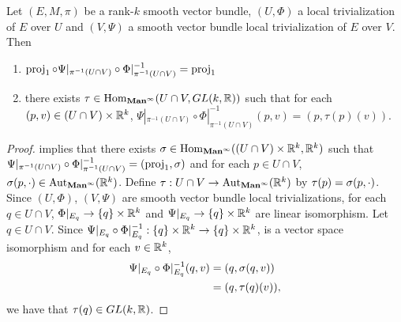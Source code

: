 \documentclass{book}
\begin{document}
\begin{ex} 
	Let $(E, M, \pi)$ be a rank-$k$ smooth vector bundle, $(U, \Phi)$ a local trivialization of $E$ over $U$ and $(V, \Psi)$ a smooth vector bundle local trivialization of $E$ over $V$. Then 
	\begin{enumerate}
		\item $\operatorname{\text{proj}}_1 \circ \Psi|_{\pi^{-1}(U \cap V)} \circ \Phi|^{-1}_{\pi^{-1}(U \cap V)} = \operatorname{\text{proj}}_1$
		\item there exists $\tau \in \operatorname{Hom}_{\operatorname*{\text{\textbf{Man}}^{\infty}}}(U \cap V, GL(k, \mathbb{R}))$ such that for each $(p, v) \in (U \cap V) \times \mathbb{R}^k$, $\Psi|_{\pi^{-1}(U \cap V)} \circ \Phi|^{-1}_{\pi^{-1}(U \cap V)}(p, v) = (p, \tau(p)(v))$.
	\end{enumerate}
\end{ex}

\begin{proof}
	 implies that there exists $\sigma \in \operatorname{Hom}_{\operatorname*{\text{\textbf{Man}}^{\infty}}}(( U \cap V) \times \mathbb{R}^k,  \mathbb{R}^k)$ such that $\Psi|_{\pi^{-1}(U \cap V)} \circ \Phi|^{-1}_{\pi^{-1}(U \cap V)} = (\operatorname{\text{proj}}_1, \sigma)$ and for each $p \in U \cap V$, $\sigma(p, \cdot) \in \operatorname{Aut}_{\operatorname*{\text{\textbf{Man}}^{\infty}}}(\mathbb{R}^k)$. Define $\tau: U \cap V \rightarrow \operatorname{Aut}_{\operatorname*{\text{\textbf{Man}}^{\infty}}}(\mathbb{R}^k)$ by $\tau(p) = \sigma(p, \cdot)$. Since $(U,\Phi)$, $(V, \Psi)$ are smooth vector bundle local trivializations, for each $q \in U\cap V$, $\Phi|_{E_q} \rightarrow \{q\} \times \mathbb{R}^k$ and $\Psi|_{E_q} \rightarrow \{q\} \times \mathbb{R}^k$ are linear isomorphism. Let $q \in U \cap V$. Since $\Psi|_{E_q} \circ \Phi|^{-1}_{E_q}: \{q\} \times \mathbb{R}^k \rightarrow \{q\} \times \mathbb{R}^k$, is a vector space isomorphism and for each $v \in \mathbb{R}^k$,
	\begin{align*}
		\Psi|_{E_q} \circ \Phi|^{-1}_{E_q}(q, v) 
		& = (q, \sigma(q,v)) \\
		& = (q, \tau(q)(v)),
	\end{align*}
	we have that $\tau(q) \in GL(k, \mathbb{R})$. 
\end{proof}
\end{document}
